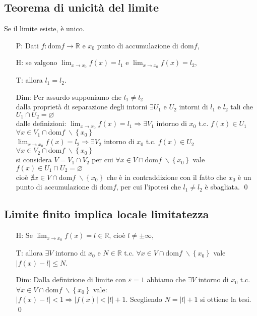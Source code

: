 \documentclass[a4paper]{article}
\newcommand\dom{\text{dom}}
\begin{document}
\subsection{Teorema di unicità del limite}
Se il limite esiste, è unico.
\begin{itemize}
	\item[P:] Dati \(f: \dom f \to \mathbb{R}\) e \(x_0\) punto di accumulazione di \(\dom f\),
	\item[H:] se valgono \(\displaystyle \lim_{x \to x_0} f(x) = l_1\) e \(\displaystyle \lim_{x \to x_0} f(x) = l_2\),
	\item[T:] allora \(l_1 = l_2\).
	\item[Dim:] Per assurdo supponiamo che \(l_1 \neq l_2\) \\
	dalla proprietà di separazione degli intorni \(\exists U_1\) e \(U_2\) intorni di \(l_1\) e \(l_2\) tali che \(U_1 \cap U_2 = \varnothing\) \\
	dalle definizioni: \(\displaystyle \lim_{x \to x_0} f(x) = l_1 \Rightarrow \exists V_1\) intorno di \(x_0\) t.c. \(f(x) \in U_1\) \(\forall x \in V_1 \cap \dom f \; \backslash \left\{ x_0 \right\}\) \\
	\(\displaystyle \lim_{x \to x_0} f(x) = l_2 \Rightarrow \exists V_2\) intorno di \(x_0\) t.c. \(f(x) \in U_2\) \(\forall x \in V_2 \cap \dom f \; \backslash \left\{ x_0 \right\}\) \\
	si considera \(V = V_1 \cap V_2\) per cui \(\forall x \in V \cap \dom f \; \backslash \left\{ x_0 \right\}\) vale \(f(x) \in U_1 \cap U_2 = \varnothing\) \\
	cioè \(\nexists x \in V \cap \dom f \; \backslash \left\{ x_0 \right\}\) che è in contraddizione con il fatto che \(x_0\) è un punto di accumulazione di \(\dom f\),
	per cui l'ipotesi che \(l_1 \neq l_2\) è sbagliata. \qed	
\end{itemize}


\subsection{Limite finito implica locale limitatezza}
\begin{itemize}
	\item[H:] Se \(\displaystyle \lim_{x \to x_0} f(x) = l \in \mathbb{R}\), cioè \(l \neq \pm \infty\),
	\item[T:] allora \(\exists V\) intorno di \(x_0\) e \(N \in \mathbb{R}\) t.c. \(\forall x \in V \cap \dom f \; \backslash \left\{ x_0 \right\}\) vale \(\left| f(x) - l \right| \leq N\).
	\item[Dim:] Dalla definizione di limite con \(\varepsilon = 1\) abbiamo che \(\exists V\) intorno di \(x_0\) t.c. \(\forall x \in V \cap \dom f \; \backslash \left\{ x_0 \right\}\) vale: \\
	\(\left| f(x) - l \right| < 1 \Rightarrow \left| f(x) \right| < \left| l \right| + 1\).	Scegliendo \(N = \left| l \right| + 1\) si ottiene la tesi. \qed 
\end{itemize}
\end{document}
